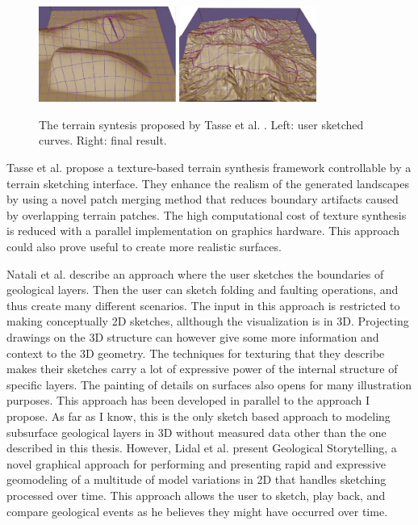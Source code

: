 \documentclass[a4paper,12pt]{report}
\begin{document}
\begin{figure}
 \centering
 \includegraphics[width=0.4\textwidth]{thesis/related/tasse1.png}
 \includegraphics[width=0.4\textwidth]{thesis/related/tasse2.png}
 \caption{The terrain syntesis proposed by Tasse et al. \cite{tasse2012enhanced}. Left: user sketched curves. Right: final result. }
 \label{fig:tasse}
\end{figure}

 
 
Tasse et al. \cite{tasse2012enhanced} propose a texture-based terrain synthesis framework controllable by
a terrain sketching interface. They enhance the realism of the generated landscapes by using a novel patch merging
method that reduces boundary artifacts caused by overlapping terrain patches. The high computational cost of texture
synthesis is reduced with a parallel implementation on graphics hardware. This approach could also prove useful to create more realistic surfaces.


Natali et al. \cite{natalirapid} describe an approach where the user sketches the boundaries of geological layers. Then the user can sketch folding and faulting operations, and thus create many different scenarios. The input in this approach is restricted to making conceptually 2D sketches, allthough the visualization is in 3D. Projecting drawings on the 3D structure can however give some more information and context to the 3D geometry. The techniques for texturing that they describe makes their sketches carry a lot of expressive power of the internal structure of specific layers. The painting of details on surfaces also opens for many illustration purposes. This approach has been developed in parallel to the approach I propose. As far as I know, this is the only sketch based approach to modeling subsurface geological layers in 3D without measured data other than the one described in this thesis. However, Lidal et al. \cite{lidal2012geological} present Geological Storytelling, a novel graphical approach for performing and presenting rapid and expressive geomodeling of a multitude of model variations in 2D that handles sketching processed over time. This approach allows the user to sketch,  play back, and compare geological events as he believes they might have occurred over time.
\end{document}
